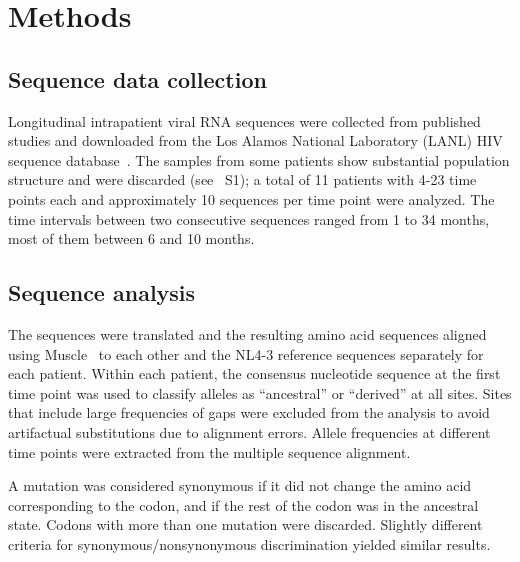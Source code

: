 \documentclass[rmp, twocolumn]{revtex4}
\newcommand{\PCApat}{1}
\begin{document}
\section{Methods}
\subsection{Sequence data collection}
Longitudinal intrapatient viral RNA sequences were collected from published
studies \citep{shankarappa_consistent_1999, liu_selection_2006,
bunnik_autologous_2008} and downloaded from the Los Alamos National Laboratory
(LANL) HIV sequence database~\citep{LANL2012}. The samples from some patients
show substantial population structure and were discarded (see
\figurename~S\PCApat); a total of 11 patients with 4-23 time points each and
approximately 10 sequences per time point were analyzed. The time intervals
between two consecutive sequences ranged from 1 to 34 months, most of them
between 6 and 10 months.

\subsection{Sequence analysis}
The sequences were translated and the resulting amino acid sequences aligned
using Muscle~\citep{edgar_muscle:_2004} to each other and the NL4-3 reference
sequences separately for each patient. Within each patient, the consensus
nucleotide sequence at the first time point was used to classify alleles as
``ancestral'' or ``derived'' at all sites. Sites that include large
frequencies of gaps were excluded from the analysis to avoid artifactual
substitutions due to alignment errors. Allele frequencies at different time
points were extracted from the multiple sequence alignment.

A mutation was considered synonymous if it did not change the amino acid
corresponding to the codon, and if the rest of the codon was in the ancestral
state. Codons with more than one mutation were discarded. Slightly different
criteria for synonymous/nonsynonymous discrimination yielded similar results.

\end{document}
